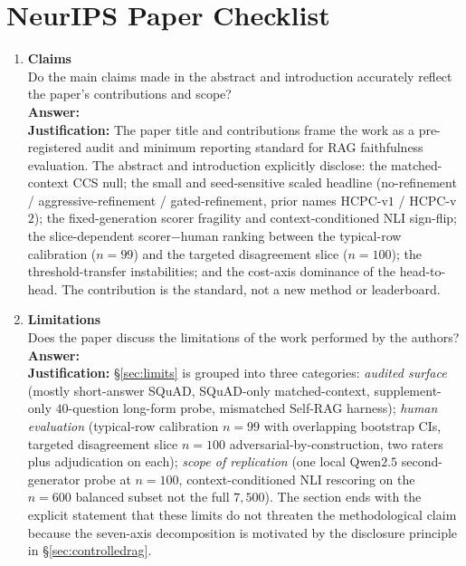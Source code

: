 %
%

\section*{NeurIPS Paper Checklist}

\begin{enumerate}

\item {\bf Claims}\\
Do the main claims made in the abstract and introduction accurately
reflect the paper's contributions and scope?
\\\textbf{Answer: \answerYes{}}
\\\textbf{Justification:} The paper title and contributions frame
the work as a pre-registered audit and minimum reporting standard for
RAG faithfulness evaluation. The abstract and introduction explicitly
disclose: the matched-context CCS null; the small and
seed-sensitive scaled headline (no-refinement /
aggressive-refinement / gated-refinement, prior names HCPC-v$1$ /
HCPC-v$2$); the fixed-generation scorer fragility and
context-conditioned NLI sign-flip; the slice-dependent
scorer$-$human ranking between the typical-row calibration
($n{=}99$) and the targeted disagreement slice ($n{=}100$); the
threshold-transfer instabilities; and the cost-axis dominance of
the head-to-head. The contribution is the standard, not a new
method or leaderboard.

\item {\bf Limitations}\\
Does the paper discuss the limitations of the work performed by the
authors?
\\\textbf{Answer: \answerYes{}}
\\\textbf{Justification:} \S\ref{sec:limits} is grouped into three
categories: \emph{audited surface} (mostly short-answer SQuAD,
SQuAD-only matched-context, supplement-only $40$-question long-form
probe, mismatched Self-RAG harness); \emph{human evaluation}
(typical-row calibration $n{=}99$ with overlapping bootstrap CIs,
targeted disagreement slice $n{=}100$ adversarial-by-construction,
two raters plus adjudication on each); \emph{scope of replication}
(one local Qwen$2.5$ second-generator probe at $n{=}100$,
context-conditioned NLI rescoring on the $n{=}600$ balanced subset
not the full $7{,}500$). The section ends with the explicit
statement that these limits do not threaten the methodological
claim because the seven-axis decomposition is motivated by the
disclosure principle in \S\ref{sec:controlledrag}.


\end{enumerate}
